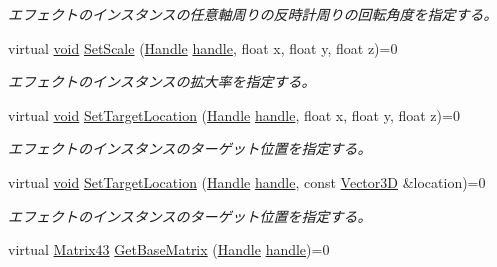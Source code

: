 \begin{DoxyCompactItemize}
\begin{DoxyCompactList}\small\item\em エフェクトのインスタンスの任意軸周りの反時計周りの回転角度を指定する。 \end{DoxyCompactList}\item 
virtual \mbox{\hyperlink{namespace_effekseer_ab34c4088e512200cf4c2716f168deb56}{void}} \mbox{\hyperlink{class_effekseer_1_1_manager_a14e45b2fc8ff1d2df98ce94c70b8cde1}{Set\+Scale}} (\mbox{\hyperlink{namespace_effekseer_afba58b8d812da862190e9bbfc040824a}{Handle}} \mbox{\hyperlink{namespace_effekseer_afd99b336b206999bdcca3e431648efbc}{handle}}, float x, float y, float z)=0
\begin{DoxyCompactList}\small\item\em エフェクトのインスタンスの拡大率を指定する。 \end{DoxyCompactList}\item 
virtual \mbox{\hyperlink{namespace_effekseer_ab34c4088e512200cf4c2716f168deb56}{void}} \mbox{\hyperlink{class_effekseer_1_1_manager_a3c709343770c431420772ab3ca6639e1}{Set\+Target\+Location}} (\mbox{\hyperlink{namespace_effekseer_afba58b8d812da862190e9bbfc040824a}{Handle}} \mbox{\hyperlink{namespace_effekseer_afd99b336b206999bdcca3e431648efbc}{handle}}, float x, float y, float z)=0
\begin{DoxyCompactList}\small\item\em エフェクトのインスタンスのターゲット位置を指定する。 \end{DoxyCompactList}\item 
virtual \mbox{\hyperlink{namespace_effekseer_ab34c4088e512200cf4c2716f168deb56}{void}} \mbox{\hyperlink{class_effekseer_1_1_manager_a193e7d5d036ff717ba3755c1fda03758}{Set\+Target\+Location}} (\mbox{\hyperlink{namespace_effekseer_afba58b8d812da862190e9bbfc040824a}{Handle}} \mbox{\hyperlink{namespace_effekseer_afd99b336b206999bdcca3e431648efbc}{handle}}, const \mbox{\hyperlink{struct_effekseer_1_1_vector3_d}{Vector3D}} \&location)=0
\begin{DoxyCompactList}\small\item\em エフェクトのインスタンスのターゲット位置を指定する。 \end{DoxyCompactList}\item 
virtual \mbox{\hyperlink{struct_effekseer_1_1_matrix43}{Matrix43}} \mbox{\hyperlink{class_effekseer_1_1_manager_a095085007e1df5de623fea1a96c31a04}{Get\+Base\+Matrix}} (\mbox{\hyperlink{namespace_effekseer_afba58b8d812da862190e9bbfc040824a}{Handle}} \mbox{\hyperlink{namespace_effekseer_afd99b336b206999bdcca3e431648efbc}{handle}})=0

\end{DoxyCompactItemize}
